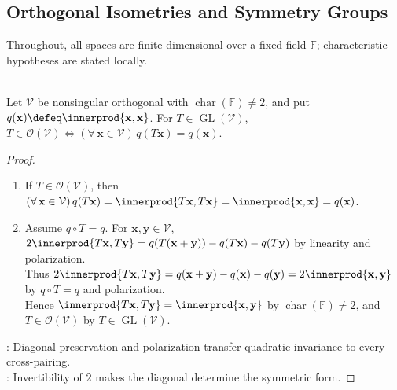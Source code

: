 \subsection{Orthogonal Isometries and Symmetry Groups}

Throughout, all spaces are finite-dimensional over a fixed field $\mathbb{F}$; characteristic hypotheses are stated locally.

\begin{proposition} \label{prop:orthogonal-isometry-preserves-quadratic-form} \\
Let $\mathcal{V}$ be nonsingular orthogonal with $\operatorname{char}(\mathbb{F})\neq2$, and put $q(\mathbf{x})\defeq\innerprod{\mathbf{x},\mathbf{x}}$. For $T\in\operatorname{GL}(\mathcal{V})$, $T\in\mathcal{O}(\mathcal{V})\Longleftrightarrow(\forall\,\mathbf{x}\in\mathcal{V})\,q(T\mathbf{x})=q(\mathbf{x})$.
\begin{proof}
\begin{enumerate}[label=\roman*.]
\setlength{\itemsep}{0pt}
\item[$(\Rightarrow)$] If $T\in\mathcal{O}(\mathcal{V})$, then $(\forall\,\mathbf{x}\in\mathcal{V})\,q(T\mathbf{x})=\innerprod{T\mathbf{x},T\mathbf{x}}=\innerprod{\mathbf{x},\mathbf{x}}=q(\mathbf{x})$.
\item[$(\Leftarrow)$] Assume $q\circ T=q$. For $\mathbf{x},\mathbf{y}\in\mathcal{V}$, $2\innerprod{T\mathbf{x},T\mathbf{y}}=q(T(\mathbf{x}+\mathbf{y}))-q(T\mathbf{x})-q(T\mathbf{y})$ by linearity and polarization.\\
Thus $2\innerprod{T\mathbf{x},T\mathbf{y}}=q(\mathbf{x}+\mathbf{y})-q(\mathbf{x})-q(\mathbf{y})=2\innerprod{\mathbf{x},\mathbf{y}}$ by $q\circ T=q$ and polarization.\\
Hence $\innerprod{T\mathbf{x},T\mathbf{y}}=\innerprod{\mathbf{x},\mathbf{y}}$ by $\operatorname{char}(\mathbb{F})\neq2$, and $T\in\mathcal{O}(\mathcal{V})$ by $T\in\operatorname{GL}(\mathcal{V})$.
\end{enumerate}
: Diagonal preservation and polarization transfer quadratic invariance to every cross-pairing.\\
: Invertibility of $2$ makes the diagonal determine the symmetric form.
\end{proof}
\end{proposition}

